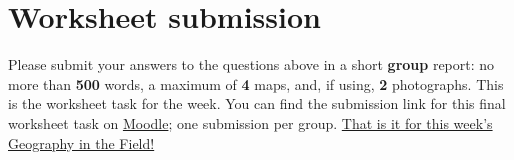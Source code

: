 \documentclass[
]{book}
\begin{document}
\hypertarget{worksheet-submission}{%
\section*{Worksheet submission}\label{worksheet-submission}}

Please submit your answers to the questions above in a short \textbf{group} report: no more than \textbf{500} words, a maximum of \textbf{4} maps, and, if using, \textbf{2} photographs. This is the worksheet task for the week. You can find the submission link for this final worksheet task on \href{https://moodle.ucl.ac.uk/course/view.php?id=23839}{Moodle}; one submission per group. \href{https://www.youtube.com/watch?v=h_D3VFfhvs4}{That is it for this week's Geography in the Field!}
\end{document}
